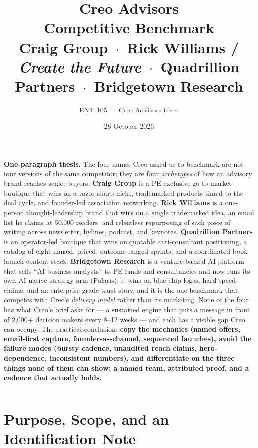 \documentclass[11pt]{article}
\title{\textbf{Creo Advisors}\\[2pt]
\large Competitive Benchmark\\[4pt]
\normalsize Craig Group \,$\cdot$\, Rick Williams / \emph{Create the Future} \,$\cdot$\, Quadrillion Partners \,$\cdot$\, Bridgetown Research}
\author{\normalsize ENT 105 --- Creo Advisors team}
\date{\normalsize 28 October 2026}
\begin{document}
\maketitle

\begin{takeaway}
\textbf{One-paragraph thesis.} The four names Creo asked us to benchmark are not
four versions of the same competitor; they are four \emph{archetypes} of how an
advisory brand reaches senior buyers. \textbf{Craig Group} is a PE-exclusive go-to-market boutique that wins on a
razor-sharp niche, trademarked products timed to the deal cycle, and founder-led
association networking. \textbf{Rick Williams} is a one-person thought-leadership
brand that wins on a single trademarked idea, an email list he claims at 50,000
readers, and relentless repurposing of each piece of writing across newsletter,
bylines, podcast, and keynotes. \textbf{Quadrillion Partners} is an operator-led
boutique that wins on quotable anti-consultant positioning, a catalog of eight
named, priced, outcome-ranged sprints, and a coordinated book-launch content stack.
\textbf{Bridgetown Research} is a venture-backed AI platform that sells
``AI business analysts'' to PE funds and consultancies and now runs its own AI-native
strategy arm (Polaris); it wins on blue-chip logos, hard speed claims, and an
enterprise-grade trust story, and it is the one benchmark that competes with Creo's
\emph{delivery model} rather than its marketing. None of the four has what Creo's brief asks for --- a sustained engine that puts a
message in front of 2,000+ decision makers every 8--12 weeks --- and each has a
visible gap Creo can occupy. The practical conclusion: \textbf{copy the mechanics
(named offers, email-first capture, founder-as-channel, sequenced launches), avoid
the failure modes (bursty cadence, unaudited reach claims, hero-dependence,
inconsistent numbers), and differentiate on the three things none of them can show:
a named team, attributed proof, and a cadence that actually holds.}
\end{takeaway}

\tableofcontents
\vspace{1em}
\hrule
\vspace{1em}

\section{Purpose, Scope, and an Identification Note}
\end{document}
